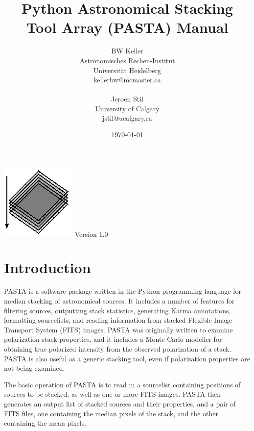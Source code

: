 \documentclass{article}
\begin{document}
\title{Python Astronomical Stacking Tool Array (PASTA) Manual}
\author{BW Keller \\ Astronomisches Rechen-Institut
\\ Universit\"at Heidelberg \\ kellerbw@mcmaster.ca \\ \\ 
Jeroen Stil \\ University
of Calgary \\ jstil@ucalgary.ca}
\maketitle
\begin{center}
\includegraphics[scale=5]{PASTA_logo.eps}
\vfill
\large{Version 1.0}\\
\normalsize
\date{\today}
\end{center}
\pagebreak
\tableofcontents
\listoffigures
\listoftables
\pagebreak
\section{Introduction}
PASTA is a software package written in the Python programming language for median
stacking of astronomical sources.  It includes a number of features for 
filtering sources, outputting stack statistics, generating Karma annotations, 
formatting sourcelists, and reading information from stacked Flexible Image 
Transport System (FITS) images.  PASTA was originally written to examine 
polarization stack properties, and it includes a Monte Carlo modeller for 
obtaining true polarized intensity from the observed polarization of a stack.  
PASTA is also useful as a generic stacking tool, even if polarization properties
are not being examined.\par

The basic operation of PASTA is to read in a sourcelist containing positions of 
sources to be stacked, as well as one or more FITS images.  PASTA then generates
an output list of stacked sources and their properties, and a pair of FITS 
files, one containing the median pixels of the stack, and the other containing 
the mean pixels.
\end{document}
